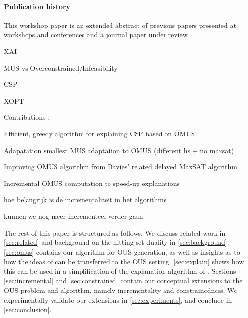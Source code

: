 {{\paragraph*{Publication history} This workshop paper is an extended abstract of previous papers presented at workshops and conferences \cite{claesuser,DBLP:conf/bnaic/ClaesBCGG19,ecai/BogaertsGCG20} and a journal paper under review \cite{bogaerts2020framework}.
}

\begin{compactenum}
    \item XAI
    \item MUS vs Overconstrained/Infeasibility
    \item CSP
    \item XOPT
\end{compactenum}

Contributions : 
\begin{compactenum}
    \item Efficient, greedy algorithm for explaining CSP based on OMUS 
    \item Adapatation smallest MUS adaptation to OMUS (different hs + no maxsat) 
    \item Improving OMUS algorithm from Davies' related delayed MaxSAT algorithm 
    \item Incremental OMUS computation to speed-up explanations
    \begin{compactitem}
        \item hoe belangrijk is de incrementaliteit in het algorithme
        \item kunnen  we nog meer incrementeel verder gaan
    \end{compactitem}
\end{compactenum}
}


The rest of this paper is structured as follows. We discuss related work in \cref{sec:related} and background on the hitting set duality in \cref{sec:background}. \cref{sec:omus} contains our algorithm for OUS generation, as well as insights as to how the ideas of \cite{davies} can be transferred to the OUS setting. \cref{sec:explain} shows how this can be used in a simplification of the explanation algorithm of \cite{ecai/BogaertsGCG20}. 
Sections \ref{sec:incremental} and \ref{sec:constrained} contain our  conceptual extensions to the OUS problem and algorithm, namely incrementality and constrainedness. 
We  experimentally validate our  extensions in \cref{sec:experiments}, and conclude in \cref{sec:conclusion}.


